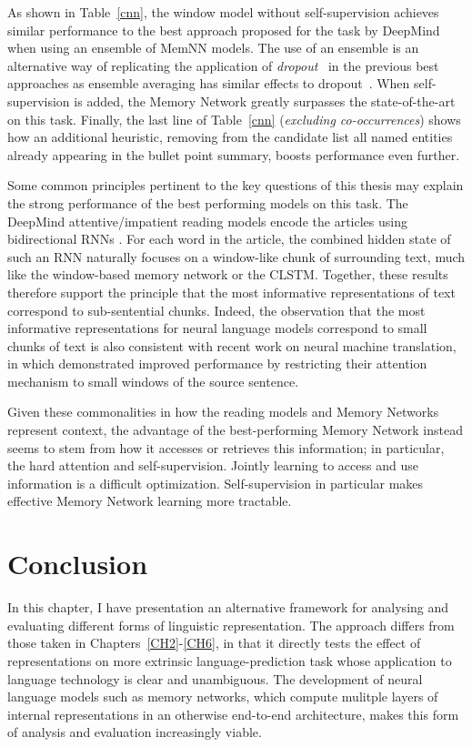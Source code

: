 As shown in Table~\ref{cnn}, the window model without self-supervision achieves similar performance to the best approach proposed for the task by DeepMind \citep{nips15_hermann} when using an ensemble of MemNN models. The use of an ensemble  is an alternative way of replicating the application of \emph{dropout}~\citep{hinton2012improving} in the previous best approaches \citep{nips15_hermann} as ensemble averaging has similar effects to dropout~\citep{wan2013regularization}. When self-supervision is added, the Memory Network
greatly surpasses the state-of-the-art on this task.  Finally, the last line of Table~\ref{cnn} (\emph{excluding co-occurrences}) shows how an additional heuristic, removing from the candidate list all named entities already appearing in the bullet point summary, boosts performance even further.


Some common principles pertinent to the key questions of this thesis may explain the strong
performance of the best performing models on this
task. The DeepMind attentive/impatient reading models encode the articles using bidirectional RNNs
\citep{graves2008unconstrained}. For each word in
the article, the combined hidden state of such an RNN naturally
focuses on a window-like chunk of surrounding text, much like the window-based memory network or the CLSTM. Together, these results therefore support the principle that the most informative representations of text correspond to sub-sentential chunks. Indeed, the observation that the most informative representations
for neural language models correspond to small chunks of text is
also consistent with recent work on neural machine translation, in which
\cite{luong2015effective} demonstrated improved performance by
restricting their attention mechanism to small  windows of
the source sentence.


Given these commonalities in how the reading models and Memory
Networks represent context, the advantage of the best-performing
Memory Network instead seems to stem from how it accesses or retrieves
this information; in particular, the hard attention and
self-supervision. Jointly learning to access and use information is a
difficult optimization. Self-supervision in particular makes effective
Memory Network learning more tractable.

\section{Conclusion}

In this chapter, I have presentation an alternative framework for analysing and evaluating different forms of linguistic representation. The approach differs from those taken in Chapters~\ref{CH2}-\ref{CH6}, in that it directly tests the effect of representations on more extrinsic language-prediction task whose application to language technology is clear and unambiguous. The development of neural language models such as memory networks, which compute mulitple layers of internal representations in an otherwise end-to-end architecture, makes this form of analysis and evaluation increasingly viable.  

